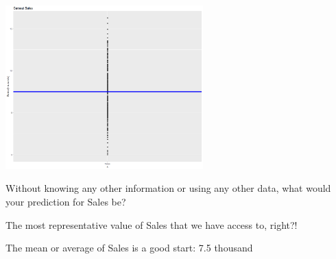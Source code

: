 \begin{frame}
\begin{center}
	\includegraphics[width = 3in]{SalesPointsMean.png}
\end{center}
\end{frame}

\begin{frame}
\bi
	\item Without knowing any other information or using any other data, what would your prediction for Sales be?
	\pause
		\bi
			\item The most representative value of Sales that we have access to, right?!
		\ei
	\pause
	
	\item The mean or average of Sales is a good start: 7.5 thousand
\ei
\end{frame}


